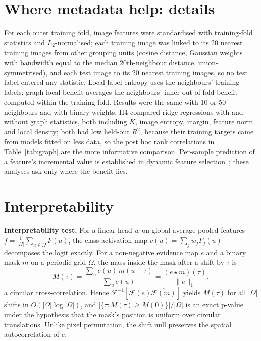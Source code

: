 \documentclass[conference]{IEEEtran}
\begin{document}
\section{Where metadata help: details}\label{app:where}

For each outer training fold, image features were standardised with training-fold statistics and $L_2$-normalised; each training image was linked to its 20 nearest training images from other grouping units (cosine distance, Gaussian weights with bandwidth equal to the median 20th-neighbour distance, union-symmetrised), and each test image to its 20 nearest training images, so no test label entered any statistic. Local label entropy uses the neighbours' training labels; graph-local benefit averages the neighbours' inner out-of-fold benefit computed within the training fold. Results were the same with 10 or 50 neighbours and with binary weights. H4 compared ridge regressions with and without graph statistics, both including $K$, image entropy, margin, feature norm and local density; both had low held-out $R^2$, because their training targets came from models fitted on less data, so the post hoc rank correlations in Table~\ref{tab:graph} are the more informative comparison. Per-sample prediction of a feature's incremental value is established in dynamic feature selection~\cite{gadgil2024cmi}; these analyses ask only where the benefit lies.

\section{Interpretability}\label{app:interp}
\textbf{Interpretability test.} For a linear head $w$ on global-average-pooled features $f=\frac1{|\Omega|}\sum_{u\in\Omega}F(u)$, the class activation map $c(u)=\sum_j w_j F_j(u)$~\cite{zhou2016cam} decomposes the logit exactly. For a non-negative evidence map $e$ and a binary mask $m$ on a periodic grid $\Omega$, the mass inside the mask after a shift by $\tau$ is
\begin{equation}
M(\tau)=\frac{\sum_{u}e(u)\,m(u-\tau)}{\sum_u e(u)}=\frac{(e\star m)(\tau)}{\|e\|_1},
\end{equation}
a circular cross-correlation. Hence $\mathcal{F}^{-1}[\mathcal{F}(e)\overline{\mathcal{F}(m)}]$ yields $M(\tau)$ for all $|\Omega|$ shifts in $O(|\Omega|\log|\Omega|)$, and $|\{\tau: M(\tau)\ge M(0)\}|/|\Omega|$ is an exact p-value under the hypothesis that the mask's position is uniform over circular translations. Unlike pixel permutation, the shift null preserves the spatial autocorrelation of $e$.
\end{document}
